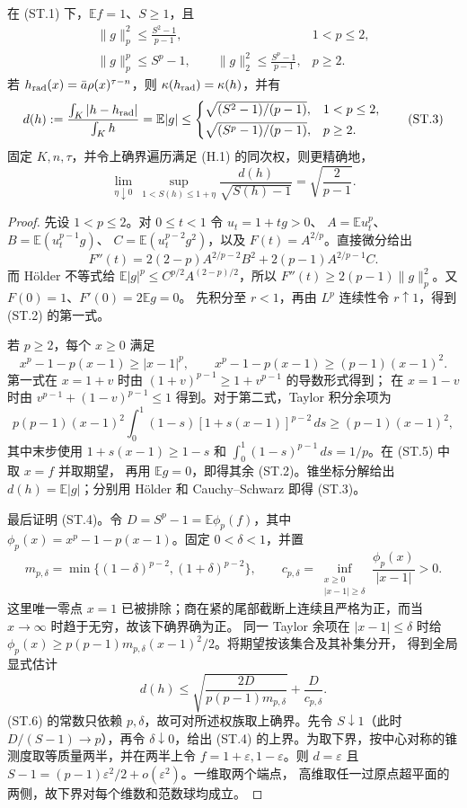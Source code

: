 \begin{proposition}[首项亏损控制角向偏离]\label{prop:angular-stability}
在 \textup{(ST.1)} 下，$\mathbb Ef=1$、$S\ge1$，且
\[
 \begin{array}{ll}
 \displaystyle\|g\|_p^2\le\frac{S^2-1}{p-1},&1<p\le2,\\[7pt]
 \displaystyle\|g\|_p^p\le S^p-1,\qquad
 \|g\|_2^2\le\frac{S^p-1}{p-1},&p\ge2.
 \end{array}\tag{ST.2}
\]
若 $h_{\rm rad}(x)=\bar a\rho(x)^{\tau-n}$，则 $\kappa(h_{\rm rad})=\kappa(h)$，并有
\[
 d(h):=\frac{\int_K|h-h_{\rm rad}|}{\int_Kh}=\mathbb E|g|
 \le\begin{cases}
 \sqrt{(S^2-1)/(p-1)},&1<p\le2,\\[2pt]
 \sqrt{(S^p-1)/(p-1)},&p\ge2.
 \end{cases}\tag{ST.3}
\]
固定 $K,n,\tau$，并令上确界遍历满足 \textup{(H.1)} 的同次权，则更精确地，
\[
 \lim_{\eta\downarrow0}\ \sup_{1<S(h)\le1+\eta}
 \frac{d(h)}{\sqrt{S(h)-1}}=\sqrt{\frac2{p-1}}.\tag{ST.4}
\]
\end{proposition}
\begin{proof}
先设 $1<p\le2$。对 $0\le t<1$ 令 $u_t=1+tg>0$、
$A=\mathbb Eu_t^p$、$B=\mathbb E(u_t^{p-1}g)$、
$C=\mathbb E(u_t^{p-2}g^2)$，以及 $F(t)=A^{2/p}$。直接微分给出
\[
 F''(t)=2(2-p)A^{2/p-2}B^2+2(p-1)A^{2/p-1}C.
\]
而 H\"older 不等式给 $\mathbb E|g|^p\le C^{p/2}A^{(2-p)/2}$，所以
$F''(t)\ge2(p-1)\|g\|_p^2$。又 $F(0)=1$、$F'(0)=2\mathbb Eg=0$。
先积分至 $r<1$，再由 $L^p$ 连续性令 $r\uparrow1$，得到 \textup{(ST.2)} 的第一式。

若 $p\ge2$，每个 $x\ge0$ 满足
\[
 x^p-1-p(x-1)\ge|x-1|^p,\qquad
 x^p-1-p(x-1)\ge(p-1)(x-1)^2.\tag{ST.5}
\]
第一式在 $x=1+v$ 时由 $(1+v)^{p-1}\ge1+v^{p-1}$ 的导数形式得到；
在 $x=1-v$ 时由 $v^{p-1}+(1-v)^{p-1}\le1$ 得到。对于第二式，Taylor
积分余项为
\[
 p(p-1)(x-1)^2\int_0^1(1-s)[1+s(x-1)]^{p-2}\,ds
 \ge(p-1)(x-1)^2,
\]
其中末步使用 $1+s(x-1)\ge1-s$ 和
\(\int_0^1(1-s)^{p-1}\,ds=1/p\)。在 \textup{(ST.5)} 中取 $x=f$ 并取期望，
再用 $\mathbb Eg=0$，即得其余 \textup{(ST.2)}。锥坐标分解给出
$d(h)=\mathbb E|g|$；分别用 H\"older 和 Cauchy--Schwarz 即得 \textup{(ST.3)}。

最后证明 \textup{(ST.4)}。令 $D=S^p-1=\mathbb E\phi_p(f)$，其中
\(\phi_p(x)=x^p-1-p(x-1)\)。固定 $0<\delta<1$，并置
\[
 m_{p,\delta}=\min\{(1-\delta)^{p-2},(1+\delta)^{p-2}\},\qquad
 c_{p,\delta}=\inf_{\substack{x\ge0\\|x-1|\ge\delta}}
 \frac{\phi_p(x)}{|x-1|}>0.
\]
这里唯一零点 $x=1$ 已被排除；商在紧的尾部截断上连续且严格为正，而当
$x\to\infty$ 时趋于无穷，故该下确界确为正。
同一 Taylor 余项在 $|x-1|\le\delta$ 时给
\(\phi_p(x)\ge p(p-1)m_{p,\delta}(x-1)^2/2\)。将期望按该集合及其补集分开，
得到全局显式估计
\[
 d(h)\le\sqrt{\frac{2D}{p(p-1)m_{p,\delta}}}+\frac D{c_{p,\delta}}.\tag{ST.6}
\]
\textup{(ST.6)} 的常数只依赖 $p,\delta$，故可对所述权族取上确界。先令
$S\downarrow1$（此时 $D/(S-1)\to p$），再令 $\delta\downarrow0$，给出
\textup{(ST.4)} 的上界。为取下界，按中心对称的锥测度取等质量两半，并在两半上令
$f=1+\varepsilon,1-\varepsilon$。则 $d=\varepsilon$ 且
\(S-1=(p-1)\varepsilon^2/2+o(\varepsilon^2)\)。一维取两个端点，
高维取任一过原点超平面的两侧，故下界对每个维数和范数球均成立。
\end{proof}

